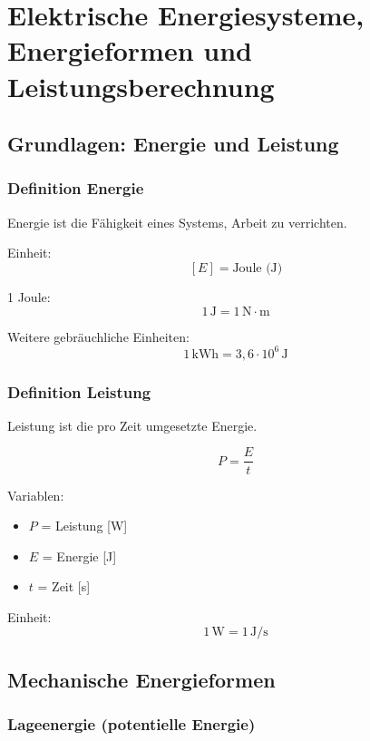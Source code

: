 \section{Elektrische Energiesysteme, Energieformen und Leistungsberechnung}

\subsection{Grundlagen: Energie und Leistung}

\subsubsection{Definition Energie}

Energie ist die Fähigkeit eines Systems, Arbeit zu verrichten.

Einheit:
\[
[E] = \text{Joule (J)}
\]

1 Joule:
\[
1\,\text{J} = 1\,\text{N}\cdot\text{m}
\]

Weitere gebräuchliche Einheiten:
\[
1\,\text{kWh} = 3{,}6 \cdot 10^6\,\text{J}
\]

\subsubsection{Definition Leistung}

Leistung ist die pro Zeit umgesetzte Energie.

\[
P = \frac{E}{t}
\]

Variablen:
\begin{itemize}
\item $P$ = Leistung [W]
\item $E$ = Energie [J]
\item $t$ = Zeit [s]
\end{itemize}

Einheit:
\[
1\,\text{W} = 1\,\text{J/s}
\]

\subsection{Mechanische Energieformen}

\subsubsection{Lageenergie (potentielle Energie)}

